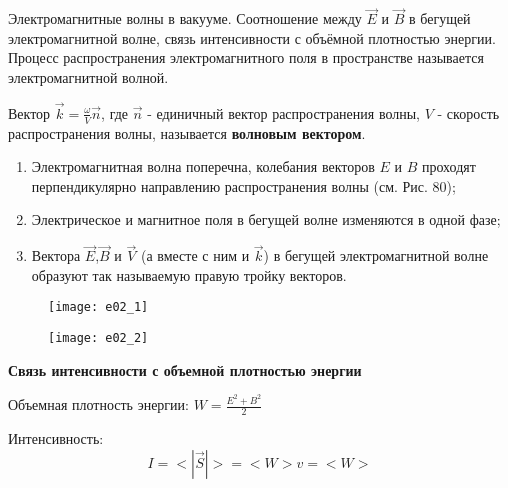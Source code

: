 \documentclass[__main__.tex]{subfiles}
\begin{document}
Электромагнитные волны в вакууме. Соотношение между $\vec{E}$ и $\vec{B}$ в бегущей электромагнитной волне, связь интенсивности с объёмной плотностью энергии.\\ 

Процесс распространения электромагнитного поля в пространстве называется электромагнитной волной. 

\begin{definition}
Вектор $\vec{k} = \frac{\omega}{V} \vec{n}$, где $\vec{n}$ - единичный вектор распространения волны, $V$ - скорость распространения волны, называется \textbf{волновым вектором}.
\end{definition}


\begin{enumerate}
\item
Электромагнитная волна поперечна, колебания векторов $E$ и $B$ проходят перпендикулярно направлению распространения волны (см. Рис. 80);
\item
Электрическое и магнитное поля в бегущей волне изменяются в одной фазе;
\item
Вектора $\vec{E}$,$\vec{B}$ и $\vec{V}$ (а вместе с ним и $\vec{k}$) в бегущей электромагнитной волне образуют так называемую правую тройку векторов.
\end{enumerate}

\begin{figure}[h]
\begin{minipage}{.45\linewidth}
    \texttt{[image: e02\_1]}
\end{minipage}
\hfill
\begin{minipage}{.45\linewidth}
    \texttt{[image: e02\_2]}
\end{minipage}
\end{figure}

\textbf{Связь интенсивности с объемной плотностью энергии}

Объемная плотность энергии: $W = \frac{E^2 + B^2}{2}$

Интенсивность: $$I = <|\vec{S}|> = <W>v = <W>$$
\end{document}
